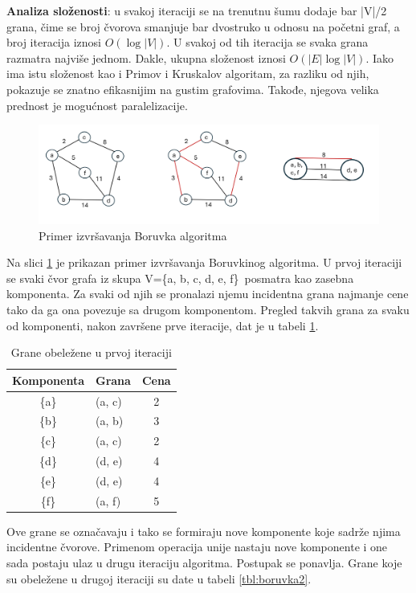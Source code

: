\documentclass[12pt,oneside]{memoir}
\begin{document}
\textbf{Analiza složenosti}: u svakoj iteraciji se na trenutnu šumu dodaje bar |V|/2 grana, čime se broj čvorova smanjuje bar dvostruko u odnosu na početni graf, a broj iteracija iznosi \( O(\log |V|) \). U svakoj od tih iteracija se svaka grana razmatra najviše jednom. Dakle, ukupna složenost iznosi \( O(|E|\log |V|) \). Iako ima istu složenost kao i Primov i Kruskalov algoritam, za razliku od njih, pokazuje se znatno efikasnijim na gustim grafovima. Takođe, njegova velika prednost je mogućnost paralelizacije.

\begin{figure}[!ht]
  \centering
  \label{fig:Boruvka}
  \includegraphics[width=1.0\textwidth]{matfmaster/BoruvkaAlgo.png}
  \caption{Primer izvršavanja Boruvka algoritma}
\end{figure}

Na slici \ref{fig:Boruvka} je prikazan primer izvršavanja Boruvkinog algoritma. U prvoj iteraciji se svaki čvor grafa iz skupa V=\{a, b, c, d, e, f\}\ posmatra kao zasebna komponenta. Za svaki od njih se pronalazi njemu incidentna grana najmanje cene tako da ga ona povezuje sa drugom komponentom. Pregled takvih grana za svaku od komponenti, nakon završene prve iteracije, dat je u tabeli \ref{tbl:boruvka1}.

\begin{table}
\centering
\label{tbl:boruvka1}
\begin{tabular}{|c|>{\centering}p{2cm}|c|}
\hline
 Komponenta & Grana & Cena\\ 
\hline
\{a\} & (a, c) & 2\\
\hline
\{b\} & (a, b) & 3\\
\hline
\{c\} & (a, c) & 2\\
\hline
\{d\} & (d, e) & 4\\
\hline
\{e\} & (d, e) & 4\\
\hline
\{f\} & (a, f) & 5\\
\hline
\end{tabular}
\caption{Grane obeležene u prvoj iteraciji}
\end{table}

Ove grane se označavaju i tako se formiraju nove komponente koje sadrže njima incidentne čvorove. Primenom operacija unije nastaju nove komponente i one sada postaju ulaz u drugu iteraciju algoritma. Postupak se ponavlja. Grane koje su obeležene u drugoj iteraciji su date u tabeli \ref{tbl:boruvka2}.
\end{document}
